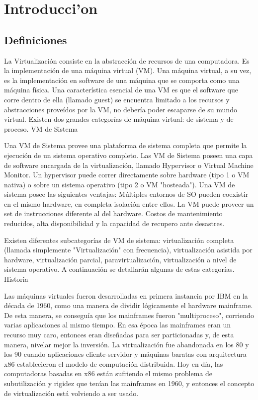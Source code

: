 \section{Introducci'on}

\subsection{Definiciones}

La Virtualización consiste en la abstracción de recursos de una computadora. Es la implementación de una máquina virtual (VM).
Una máquina virtual, a su vez, es la implementación en software de una máquina que se comporta como una máquina física. Una característica esencial de una VM es que el software que corre dentro de ella (llamado guest) se encuentra limitado a los recursos y abstracciones proveídos por la VM, no debería poder escaparse de su mundo virtual.
Existen dos grandes categorías de máquina virtual: de sistema y de proceso.
VM de Sistema

Una VM de Sistema provee una plataforma de sistema completa que permite la ejecución de un sistema operativo completo. Las VM de Sistema poseen una capa de software encargada de la virtualización, llamado Hypervisor o Virtual Machine Monitor. Un hypervisor puede correr directamente sobre hardware (tipo 1 o VM nativa) o sobre un sistema operativo (tipo 2 o VM "hosteada").
Una VM de sistema posee las siguientes ventajas:
Múltiples entornos de SO pueden coexistir en el mismo hardware, en completa isolación entre ellos.
La VM puede proveer un set de instrucciones diferente al del hardware.
Costos de mantenimiento reducidos, alta disponibilidad y la capacidad de recupero ante desastres.

Existen diferentes subcategorías de VM de sistema: virtualización completa (llamada simplemente "Virtualización" con frecuencia), virtualización asistida por hardware, virtualización parcial, paravirtualización, virtualización a nivel de sistema operativo. A continuación se detallarán algunas de estas categorías.
Historia

Las máquinas virtuales fueron desarrolladas en primera instancia por IBM en la década de 1960, como una manera de dividir lógicamente el hardware mainframe. De esta manera, se conseguía que los mainframes fueron "multiproceso", corriendo varias aplicaciones al mismo tiempo. En esa época las mainframes eran un recurso muy caro, entonces eran diseñadas para ser particionadas y, de esta manera, nivelar mejor la inversión. La virtualización fue abandonada en los 80 y los 90 cuando aplicaciones cliente-servidor y máquinas baratas con arquitectura x86 establecieron el modelo de computación distribuida. Hoy en día, las computadoras basadas en x86 están sufriendo el mismo problema de subutilización y rigidez que tenían las mainframes en 1960, y entonces el concepto de virtualización está volviendo a ser usado.

